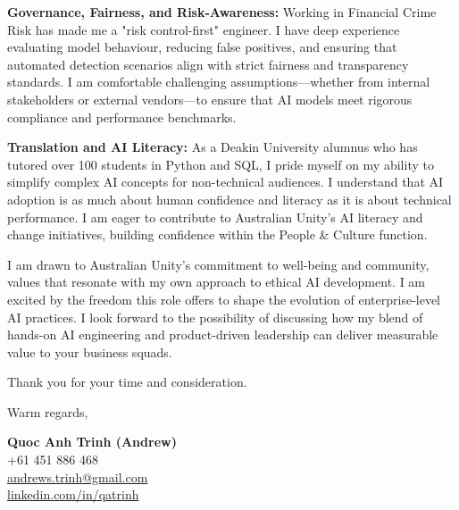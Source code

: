 \documentclass[11pt, a4paper]{article}
\begin{document}
\textbf{Governance, Fairness, and Risk-Awareness:}
Working in Financial Crime Risk has made me a "risk control-first" engineer. I have deep experience evaluating model behaviour, reducing false positives, and ensuring that automated detection scenarios align with strict fairness and transparency standards. I am comfortable challenging assumptions—whether from internal stakeholders or external vendors—to ensure that AI models meet rigorous compliance and performance benchmarks.

\textbf{Translation and AI Literacy:}
As a Deakin University alumnus who has tutored over 100 students in Python and SQL, I pride myself on my ability to simplify complex AI concepts for non-technical audiences. I understand that AI adoption is as much about human confidence and literacy as it is about technical performance. I am eager to contribute to Australian Unity's AI literacy and change initiatives, building confidence within the People \& Culture function.

I am drawn to Australian Unity’s commitment to well-being and community, values that resonate with my own approach to ethical AI development. I am excited by the freedom this role offers to shape the evolution of enterprise-level AI practices. I look forward to the possibility of discussing how my blend of hands-on AI engineering and product-driven leadership can deliver measurable value to your business squads.

Thank you for your time and consideration.

\vspace{20pt}

Warm regards,

\vspace{30pt}

\textbf{Quoc Anh Trinh (Andrew)}\\
+61 451 886 468\\
\href{mailto:andrews.trinh@gmail.com}{andrews.trinh@gmail.com}\\
\href{https://www.linkedin.com/in/qatrinh}{linkedin.com/in/qatrinh}
\end{document}
